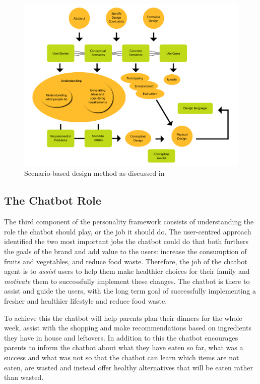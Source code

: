      \begin{figure}
            \centering
            \includegraphics[width=\textwidth]{figures/Scenariobasedmethod.png}
            \caption{Scenario-based design method as discussed in \cite{Benyon2014}}
            \label{fig:scen}
        \end{figure}
    
\vspace{2,5mm} %

    \subsection{The Chatbot Role}
    
    The third component of the personality framework consists of understanding the role the chatbot should play, or the job it should do. The user-centred approach identified the two most important jobs the chatbot could do that both furthers the goals of the brand and add value to the users: increase the consumption of fruits and vegetables, and reduce food waste. Therefore, the job of the chatbot agent is to \textit{assist} users to help them make healthier choices for their family and \textit{motivate} them to successfully implement these changes. The chatbot is there to assist and guide the users, with the long term goal of successfully implementing a fresher and healthier lifestyle and reduce food waste. 
    
    To achieve this the chatbot will help parents plan their dinners for the whole week, assist with the shopping and make recommendations based on ingredients they have in house and leftovers. In addition to this the chatbot encourages parents to inform the chatbot about what they have eaten so far, what was a success and what was not so that the chatbot can learn which items are not eaten, are wasted and instead offer healthy alternatives that will be eaten rather than wasted. 
    
